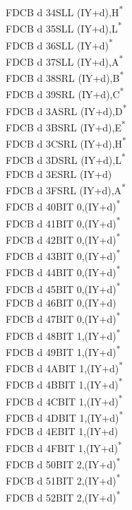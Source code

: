 \documentclass[twoside,openright,a4paper]{book}
\begin{document}
\begin{multicols}{3}
{\begin{tabbing}
	FDCB d 34\>SLL (IY+d),H\textsuperscript{*}\\
	FDCB d 35\>SLL (IY+d),L\textsuperscript{*}\\
	FDCB d 36\>SLL (IY+d)\textsuperscript{*}\\
	FDCB d 37\>SLL (IY+d),A\textsuperscript{*}\\
	FDCB d 38\>SRL (IY+d),B\textsuperscript{*}\\
	FDCB d 39\>SRL (IY+d),C\textsuperscript{*}\\
	FDCB d 3A\>SRL (IY+d),D\textsuperscript{*}\\
	FDCB d 3B\>SRL (IY+d),E\textsuperscript{*}\\
	FDCB d 3C\>SRL (IY+d),H\textsuperscript{*}\\
	FDCB d 3D\>SRL (IY+d),L\textsuperscript{*}\\
	FDCB d 3E\>SRL (IY+d)\\
	FDCB d 3F\>SRL (IY+d),A\textsuperscript{*}\\
	FDCB d 40\>BIT 0,(IY+d)\textsuperscript{*}\\
	FDCB d 41\>BIT 0,(IY+d)\textsuperscript{*}\\
	FDCB d 42\>BIT 0,(IY+d)\textsuperscript{*}\\
	FDCB d 43\>BIT 0,(IY+d)\textsuperscript{*}\\
	FDCB d 44\>BIT 0,(IY+d)\textsuperscript{*}\\
	FDCB d 45\>BIT 0,(IY+d)\textsuperscript{*}\\
	FDCB d 46\>BIT 0,(IY+d)\\
	FDCB d 47\>BIT 0,(IY+d)\textsuperscript{*}\\
	FDCB d 48\>BIT 1,(IY+d)\textsuperscript{*}\\
	FDCB d 49\>BIT 1,(IY+d)\textsuperscript{*}\\
	FDCB d 4A\>BIT 1,(IY+d)\textsuperscript{*}\\
	FDCB d 4B\>BIT 1,(IY+d)\textsuperscript{*}\\
	FDCB d 4C\>BIT 1,(IY+d)\textsuperscript{*}\\
	FDCB d 4D\>BIT 1,(IY+d)\textsuperscript{*}\\
	FDCB d 4E\>BIT 1,(IY+d)\\
	FDCB d 4F\>BIT 1,(IY+d)\textsuperscript{*}\\
	FDCB d 50\>BIT 2,(IY+d)\textsuperscript{*}\\
	FDCB d 51\>BIT 2,(IY+d)\textsuperscript{*}\\
	FDCB d 52\>BIT 2,(IY+d)\textsuperscript{*}\\

\end{tabbing}}
\end{multicols}
\end{document}
